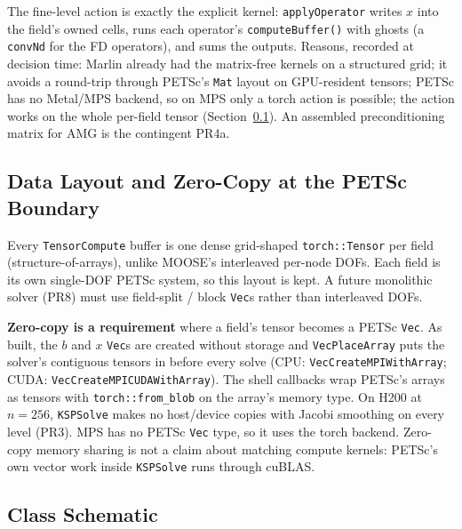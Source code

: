 \documentclass[11pt]{article}
\begin{document}
The fine-level action is exactly the explicit kernel: \texttt{applyOperator}
writes $x$ into the field's owned cells, runs each operator's
\texttt{computeBuffer()} with ghosts (a \texttt{convNd} for the FD
operators), and sums the outputs. Reasons, recorded at decision time: Marlin
already had the matrix-free kernels on a structured grid; it avoids a
round-trip through PETSc's \texttt{Mat} layout on GPU-resident tensors; PETSc
has no Metal/MPS backend, so on MPS only a torch action is possible; the
action works on the whole per-field tensor (Section~\ref{sec:soa}). An
assembled preconditioning matrix for AMG is the contingent PR4a.

\subsection{Data Layout and Zero-Copy at the PETSc Boundary}
\label{sec:soa}

Every \texttt{TensorCompute} buffer is one dense grid-shaped
\texttt{torch::Tensor} per field (structure-of-arrays), unlike MOOSE's
interleaved per-node DOFs. Each field is its own single-DOF PETSc system, so
this layout is kept. A future monolithic solver (PR8) must use field-split /
block \texttt{Vec}s rather than interleaved DOFs.

\textbf{Zero-copy is a requirement} where a field's tensor becomes a PETSc
\texttt{Vec}. As built, the $b$ and $x$ \texttt{Vec}s are created without
storage and \texttt{VecPlaceArray} puts the solver's contiguous tensors in
before every solve (CPU: \texttt{VecCreateMPIWithArray}; CUDA:
\texttt{VecCreateMPICUDAWithArray}). The shell callbacks wrap PETSc's arrays
as tensors with \texttt{torch::from\_blob} on the array's memory type. On
H200 at $n=256$, \texttt{KSPSolve} makes no host/device copies with Jacobi
smoothing on every level (PR3). MPS has no PETSc \texttt{Vec} type, so it
uses the torch backend. Zero-copy memory sharing is not a claim about
matching compute kernels: PETSc's own vector work inside \texttt{KSPSolve}
runs through cuBLAS.

\subsection{Class Schematic}
\end{document}
